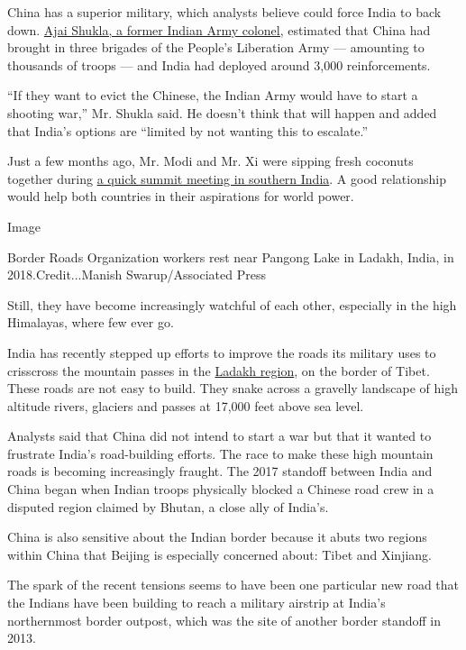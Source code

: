 China has a superior military, which analysts believe could force India
to back down.
\href{https://twitter.com/ajaishukla/status/1265267130825465856}{Ajai
Shukla, a former Indian Army colonel,} estimated that China had brought
in three brigades of the People's Liberation Army --- amounting to
thousands of troops --- and India had deployed around 3,000
reinforcements.

``If they want to evict the Chinese, the Indian Army would have to start
a shooting war,'' Mr. Shukla said. He doesn't think that will happen and
added that India's options are ``limited by not wanting this to
escalate.''

Just a few months ago, Mr. Modi and Mr. Xi were sipping fresh coconuts
together during
\href{https://www.nytimes.com/2019/10/11/world/asia/narendra-modi-xi-jinping-india-china.html}{a
quick summit meeting in southern India}. A good relationship would help
both countries in their aspirations for world power.

Image

Border Roads Organization workers rest near Pangong Lake in Ladakh,
India, in 2018.Credit...Manish Swarup/Associated Press

Still, they have become increasingly watchful of each other, especially
in the high Himalayas, where few ever go.

India has recently stepped up efforts to improve the roads its military
uses to crisscross the mountain passes in the
\href{https://www.nytimes.com/2020/07/11/world/asia/india-china-border-ladakh.html}{Ladakh
region}, on the border of Tibet. These roads are not easy to build. They
snake across a gravelly landscape of high altitude rivers, glaciers and
passes at 17,000 feet above sea level.

Analysts said that China did not intend to start a war but that it
wanted to frustrate India's road-building efforts. The race to make
these high mountain roads is becoming increasingly fraught. The 2017
standoff between India and China began when Indian troops physically
blocked a Chinese road crew in a disputed region claimed by Bhutan, a
close ally of India's.

China is also sensitive about the Indian border because it abuts two
regions within China that Beijing is especially concerned about: Tibet
and Xinjiang.

The spark of the recent tensions seems to have been one particular new
road that the Indians have been building to reach a military airstrip at
India's northernmost border outpost, which was the site of another
border standoff in 2013.

